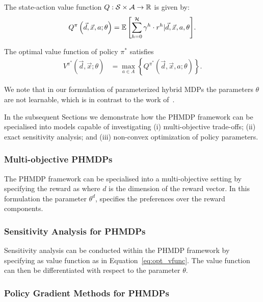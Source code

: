 The state-action value function {\footnotesize$Q : \mathcal{S} \times \mathcal{A} \rightarrow \mathbb{R}$} is given by:
{\footnotesize 
    \abovedisplayskip=0pt
    \belowdisplayskip=0pt
\begin{align*}
    Q^{\pi}\left(\vec{d}, \vec{x}, a; \theta\right) = {\mathbb{E}\left[{\sum\limits_{h = 0}^{\mathcal{H}} \gamma^h \cdot r^h | \vec{d}, \vec{x}, a, \theta}\right]}.
\end{align*}
}

The optimal value function of policy {\footnotesize$ \pi^{*} $} satisfies
{\footnotesize 
\abovedisplayskip=0pt
\belowdisplayskip=0pt
\begin{align}
    \label{eq:opt_vfunc}
    V^{\pi^{*}}(\vec{d}, \vec{x}; \theta) &= \max_{a \in A} \left\{ Q^{\pi^{*}}(\vec{d}, \vec{x}, a; \theta) \right\}. 
\end{align}
}%

We note that in our formulation of parameterized hybrid MDPs the parameters {\footnotesize $ \theta $} are not learnable, which is in contrast to the work of~\parencite{Dearden_UAI_1999}.

In the subsequent Sections we demonstrate how the PHMDP framework can be specialised into models capable of investigating (i) multi-objective trade-offs; (ii) exact sensitivity analysis; and (iii) non-convex optimization of policy parameters.

\subsubsection{Multi-objective PHMDPs}

The PHMDP framework can be specialised into a multi-objective setting by specifying the reward as {\footnotesize \MORewardFunc} where {\footnotesize $ d $} is the dimension of the reward vector. In this formulation the parameter {\footnotesize $ \theta^{d} $}, specifies the preferences over the reward components.

\subsubsection{Sensitivity Analysis for PHMDPs}

Sensitivity analysis can be conducted within the PHMDP framework by specifying as value function as in Equation~\eqref{eq:opt_vfunc}. The value function can then be differentiated with respect to the parameter {\footnotesize $ \theta $}.

\subsubsection{Policy Gradient Methods for PHMDPs}

